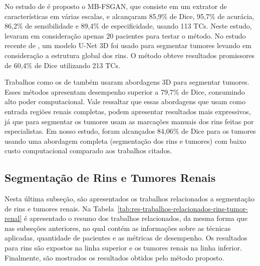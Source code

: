 No estudo de  é proposto o MB-FSGAN, que consiste em um extrator de características em várias escalas, e alcançaram 85,9\% de Dice, 95,7\% de acurácia, 86,2\% de sensibilidade e 89,4\% de especificidade, usando 113 TCs. Neste estudo, levaram em consideração apenas 20 pacientes para testar o método. No estudo recente de , um modelo U-Net 3D foi usado para segmentar tumores levando em consideração a estrutura global dos rins. O método obteve resultados promissores de 60,4\% de Dice utilizando 213 TCs.

Trabalhos como os de  também usaram abordagens 3D para segmentar tumores. Esses métodos apresentam desempenho superior a 79,7\% de Dice, consumindo alto poder computacional. Vale ressaltar que essas abordagens que usam como entrada regiões renais completas, podem apresentar resultados mais expressivos, já que para segmentar os tumores usam as marcações manuais dos rins feitas por especialistas. Em nosso estudo, foram alcançados 84,06\% de Dice para os tumores usando uma abordagem completa (segmentação dos rins e tumores) com baixo custo computacional comparado aos trabalhos citados.

\subsection{Segmentação de Rins e Tumores Renais}
\label{sec:disc-trab-relac-rins-tumor-renal}

Nesta última subseção, são apresentados os trabalhos relacionados a segmentação de rins e tumores renais. Na Tabela~\ref{tab:res-trabalhos-relacionados-rins-tumor-renal} é apresentado o resumo dos trabalhos relacionados, da mesma forma que nas subseções anteriores, no qual contém as informações sobre as técnicas aplicadas, quantidade de pacientes e as métricas de desempenho. Os resultados para rins são expostos na linha superior e os tumores renais na linha inferior. Finalmente, são mostrados os resultados obtidos pelo método proposto.

